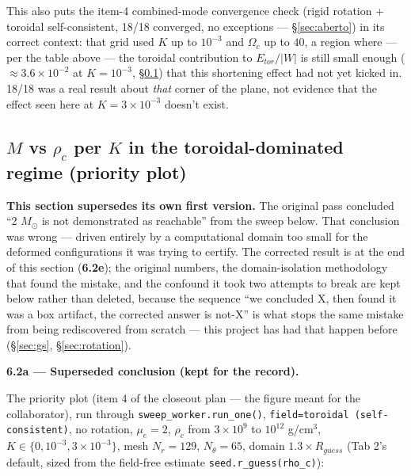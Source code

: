 \documentclass[11pt,a4paper]{scrartcl}
\newcommand{\code}[1]{\texttt{\small #1}}
\begin{document}
This also puts the item-4 combined-mode convergence check (rigid
rotation + toroidal self-consistent, 18/18 converged, no exceptions ---
\S\ref{sec:aberto}) in its correct context: that grid used $K$ up to
$10^{-3}$ and $\Omega_c$ up to $40$, a region where --- per the table
above --- the toroidal contribution to $E_{tor}/|W|$ is still small
enough ($\approx3.6\times10^{-2}$ at $K=10^{-3}$,
\S\ref{sec:results-priority}) that this shortening effect had not yet
kicked in. 18/18 was a real result about \emph{that} corner of the
plane, not evidence that the effect seen here at $K=3\times10^{-3}$
doesn't exist.

\subsection{\texorpdfstring{$M$ vs $\rho_c$ per $K$ in the toroidal-dominated regime (priority plot)}{M vs rho\_c per K in the toroidal-dominated regime (priority plot)}}
\label{sec:results-priority}

\textbf{This section supersedes its own first version.} The original
pass concluded ``2 $M_\odot$ is not demonstrated as reachable'' from
the sweep below. That conclusion was wrong --- driven entirely by a
computational domain too small for the deformed configurations it was
trying to certify. The corrected result is at the end of this section
(\textbf{6.2e}); the original numbers, the domain-isolation methodology
that found the mistake, and the confound it took two attempts to break
are kept below rather than deleted, because the sequence ``we concluded
X, then found it was a box artifact, the corrected answer is not-X'' is
what stops the same mistake from being rediscovered from scratch ---
this project has had that happen before (\S\ref{sec:gs},
\S\ref{sec:rotation}).

\medskip\noindent\textbf{6.2a --- Superseded conclusion (kept for the record).}

The priority plot (item 4 of the closeout plan --- the figure meant for
the collaborator), run through \code{sweep\_worker.run\_one()},
\code{field=toroidal (self-consistent)}, no rotation, $\mu_e=2$,
$\rho_c$ from $3\times10^9$ to $10^{12}$ g/cm$^3$,
$K\in\{0,10^{-3},3\times10^{-3}\}$, mesh $N_r=129$, $N_\theta=65$,
domain $1.3\times R_{guess}$ (Tab 2's default, sized from the
field-free estimate \code{seed.r\_guess(rho\_c)}):
\end{document}
